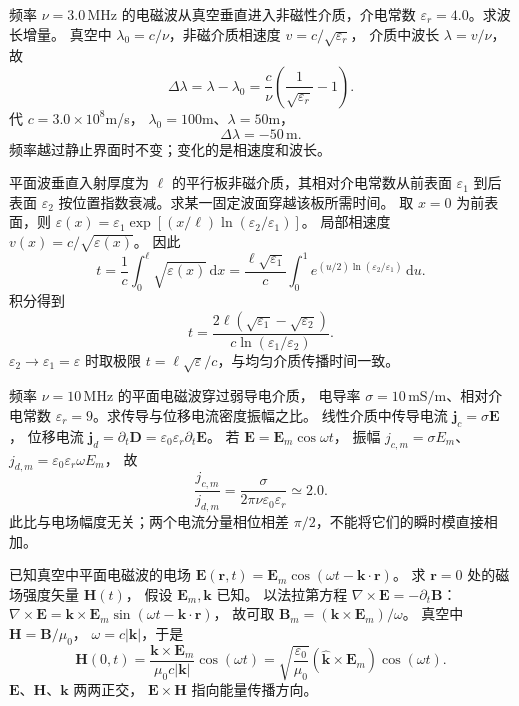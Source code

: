 频率 $\nu=3.0\,\mathrm{MHz}$ 的电磁波从真空垂直进入非磁性介质，介电常数 $\varepsilon_r=4.0$。求波长增量。
\exsolution
真空中 $\lambda_0=c/\nu$，非磁介质相速度 $v=c/\sqrt{\varepsilon_r}$，
介质中波长 $\lambda=v/\nu$，故
\[
\boxed{\Delta\lambda=\lambda-\lambda_0
=\frac c\nu\left(\frac1{\sqrt{\varepsilon_r}}-1\right)}.
\]
代 $c=3.0\times10^8$m/s，
$\lambda_0=100$m、$\lambda=50$m，
\[
\boxed{\Delta\lambda=-50\,\mathrm m}.
\]
\excheck 频率越过静止界面时不变；变化的是相速度和波长。

平面波垂直入射厚度为 $\ell$ 的平行板非磁介质，其相对介电常数从前表面 $\varepsilon_1$ 到后表面 $\varepsilon_2$ 按位置指数衰减。求某一固定波面穿越该板所需时间。
\exsolution
取 $x=0$ 为前表面，则
$\varepsilon(x)=\varepsilon_1
\exp[(x/\ell)\ln(\varepsilon_2/\varepsilon_1)]$。
局部相速度 $v(x)=c/\sqrt{\varepsilon(x)}$。
因此
\[
t=\frac1c\int_0^\ell\sqrt{\varepsilon(x)}\,\mathrm dx
=\frac{\ell\sqrt{\varepsilon_1}}c
\int_0^1 e^{(u/2)\ln(\varepsilon_2/\varepsilon_1)}\,\mathrm du.
\]
积分得到
\[
\boxed{t=
\frac{2\ell(\sqrt{\varepsilon_1}-\sqrt{\varepsilon_2})}
{c\ln(\varepsilon_1/\varepsilon_2)}}.
\]
\excheck $\varepsilon_2\to\varepsilon_1=\varepsilon$ 时取极限
$t=\ell\sqrt\varepsilon/c$，与均匀介质传播时间一致。

频率 $\nu=10\,\mathrm{MHz}$ 的平面电磁波穿过弱导电介质，
电导率 $\sigma=10\,\mathrm{mS/m}$、相对介电常数 $\varepsilon_r=9$。求传导与位移电流密度振幅之比。
\exsolution
线性介质中传导电流
$\bm j_c=\sigma\bm E$，
位移电流
$\bm j_d=\partial_t\bm D
=\varepsilon_0\varepsilon_r\partial_t\bm E$。
若 $\bm E=\bm E_m\cos\omega t$，
振幅
$j_{c,m}=\sigma E_m$、
$j_{d,m}=\varepsilon_0\varepsilon_r\omega E_m$，
故
\[
\boxed{\frac{j_{c,m}}{j_{d,m}}
=\frac{\sigma}{2\pi\nu\varepsilon_0\varepsilon_r}
\simeq2.0}.
\]
\excheck 此比与电场幅度无关；两个电流分量相位相差 $\pi/2$，不能将它们的瞬时模直接相加。

已知真空中平面电磁波的电场
$\bm E(\bm r,t)=\bm E_m\cos(\omega t-\bm k\cdot\bm r)$。
求 $\bm r=0$ 处的磁场强度矢量 $\bm H(t)$，
假设 $\bm E_m,\bm k$ 已知。
\exsolution
以法拉第方程
$\nabla\times\bm E=-\partial_t\bm B$：
$\nabla\times\bm E=
\bm k\times\bm E_m\sin(\omega t-\bm k\cdot\bm r)$，
故可取
$\bm B_m=(\bm k\times\bm E_m)/\omega$。
真空中 $\bm H=\bm B/\mu_0$，
$\omega=c|\bm k|$，于是
\[
\boxed{\bm H(0,t)=
\frac{\bm k\times\bm E_m}
{\mu_0c|\bm k|}\cos(\omega t)
=\sqrt{\frac{\varepsilon_0}{\mu_0}}
(\hat{\bm k}\times\bm E_m)\cos(\omega t)}.
\]
\excheck $\bm E$、$\bm H$、$\bm k$ 两两正交，
$\bm E\times\bm H$ 指向能量传播方向。

